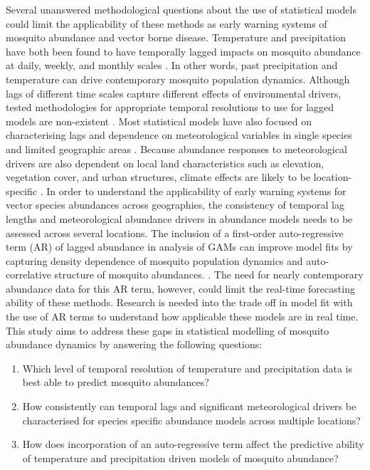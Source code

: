 Several unanswered methodological questions about the use of statistical models could limit the applicability of these methods as early warning systems of mosquito abundance and vector borne disease. Temperature and precipitation have both been found to have temporally lagged impacts on mosquito abundance at daily, weekly, and monthly scales \citep{Chuang2012, Poh2019, Xu2017, Wang2011}. In other words, past precipitation and temperature can drive contemporary mosquito population dynamics. Although lags of different time scales capture different effects of environmental drivers, tested methodologies for appropriate temporal resolutions to use for lagged models are non-existent \citep{Mordecai2019}. Most statistical models have also focused on characterising lags and dependence on meteorological variables in single species and limited geographic areas \citep{Chuang2012, Wang2011, Poh2019, Yoo2016}. Because abundance responses to meteorological drivers are also dependent on local land characteristics such as elevation, vegetation cover, and urban structures, climate effects are likely to be location-specific \citep{Ahumada2004, Yoo2016}. In order to understand the applicability of early warning systems for vector species abundances across geographies, the consistency of temporal lag lengths and meteorological abundance drivers in abundance models needs to be assessed across several locations. The inclusion of a first-order auto-regressive term (AR) of lagged abundance in analysis of GAMs can improve model fits by capturing density dependence of mosquito population dynamics and auto-correlative structure of mosquito abundances. \citep{DaCruzFerreira2017, Li2019, Xu2017}. The need for nearly contemporary abundance data for this AR term, however, could limit the real-time forecasting ability of these methods. Research is needed into the trade off in model fit with the use of AR terms to understand how applicable these models are in real time. This study aims to address these gaps in statistical modelling of mosquito abundance dynamics by answering the following questions:

\begin{enumerate}
	\item Which level of temporal resolution of temperature and precipitation data is best able to predict mosquito abundances?
	
	\item How consistently can temporal lags and significant meteorological drivers be characterised for species specific abundance models across multiple locations?
	
	\item How does incorporation of an auto-regressive term affect the predictive ability of temperature and precipitation driven models of mosquito abundance?
\end{enumerate}

